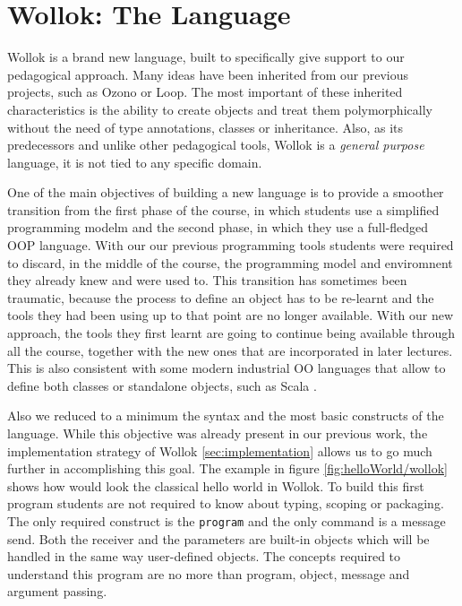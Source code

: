 \section{Wollok: The Language}
\label{sec:wollokLanguage}


Wollok is a brand new language, built to specifically give support to our pedagogical approach.
Many ideas have been inherited from our previous projects, such as Ozono or Loop. 
The most important of these inherited characteristics is the ability to create objects and treat them polymorphically without the need of type annotations, classes or inheritance.
Also, as its predecessors and unlike other pedagogical tools, Wollok is a \emph{general purpose} language, \ie it is not tied to any specific domain.

\medskip
One of the main objectives of building a new language is to provide a smoother transition from the first phase of the course,
in which students use a simplified programming modelm and the second phase, in which they use a full-fledged OOP language.
With our our previous programming tools students were required to discard, in the middle of the course, the programming model and enviromnent they already knew and were used to.
This transition has sometimes been traumatic, because the process to define an object has to be re-learnt and the tools they had been using up to that point are no longer available.
With our new approach, the tools they first learnt are going to continue being available through all the course, together with the new ones that are incorporated in later lectures.
This is also consistent with some modern industrial OO languages that allow to define both classes or standalone objects, such as Scala \cite{Oder04a}.


\medskip
Also we reduced to a minimum the syntax and the most basic constructs of the language.
While this objective was already present in our previous work, the implementation strategy of Wollok \cf \ref{sec:implementation} allows us to go much further in accomplishing this goal.
The example in figure \ref{fig:helloWorld/wollok} shows how would look the classical hello world in Wollok.
To build this first program students are not required to know about typing, scoping or packaging.
The only required construct is the \lstinline[language=Wollok]{program} and the only command is a message send.
Both the receiver and the parameters are built-in objects which will be handled in the same way user-defined objects.
The concepts required to understand this program are no more than program, object, message and argument passing.

